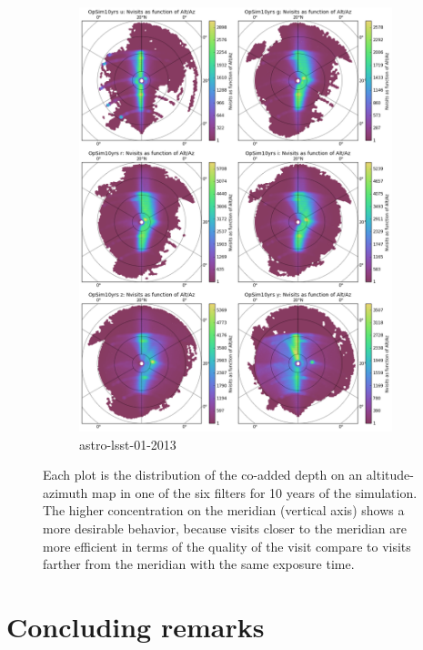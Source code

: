 \documentclass[12pt,aas_macros]{article}
\theoremstyle{definition}
\begin{document}
\begin{figure}[h!]
\begin{subfigure}{.5\textwidth}
  \includegraphics[width=.9\linewidth]{OpSim10yrs_AltAz.png}
  \caption{astro-lsst-01-2013}
  \label{fig_10yrs_AltAz_OpSim}
\end{subfigure}
\caption{Each plot is the distribution of the co-added depth on an altitude-azimuth map in one of the six filters for 10 years of the simulation. The higher concentration on the meridian (vertical axis) shows a more desirable behavior, because visits closer to the meridian are more efficient in terms of the quality of the visit compare to visits farther from the meridian with the same exposure time.}
\label{fig_10yrs_AltAz}
\end{figure}



\section{Concluding remarks}\label{sec_conclusion}
\end{document}
